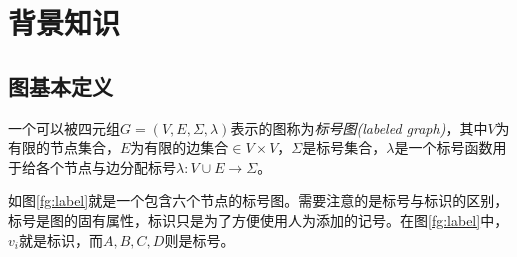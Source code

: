 \documentclass{XDBAthesis}
\begin{document}
\else
\fi
\chapter{背景知识}
\label{chap:background}
\section{图基本定义}
\begin{defn}
    一个可以被四元组$G=(V,E,\Sigma,\lambda)$表示的图称为\emph{标号图(labeled graph)}，其中$V$为有限的节点集合，$E$为有限的边集合$\in V\times V$，$\Sigma$是标号集合，$\lambda$是一个标号函数用于给各个节点与边分配标号$\lambda :V\cup E\rightarrow\Sigma$。
\end{defn}
如图\ref{fg:label}就是一个包含六个节点的标号图。需要注意的是标号与标识的区别，标号是图的固有属性，标识只是为了方便使用人为添加的记号。在图\ref{fg:label}中，$v_i $就是标识，而$A,B,C,D$则是标号。
\end{document}
